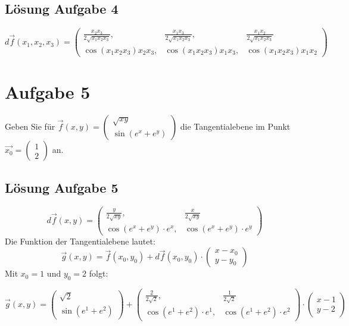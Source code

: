 \documentclass[ngerman, a4paper]{scrartcl}
\begin{document}
	\subsection*{Lösung Aufgabe 4}
	\[
	d\vec{f}(x_1, x_2, x_3) =
	\begin{pmatrix}
		\frac{x_2x_3}{2\sqrt{x_1x_2x_3}}, & \frac{x_1x_3}{2\sqrt{x_1x_2x_3}}, & \frac{x_1x_2}{2\sqrt{x_1x_2x_3}}\\
		\cos(x_1x_2x_3)x_2x_3, & \cos(x_1x_2x_3)x_1x_3, & \cos(x_1x_2x_3)x_1x_2
	\end{pmatrix}
	\]
	
	\section*{Aufgabe 5}
	Geben Sie für 
	$
	\vec{f}(x, y) = 
	\begin{pmatrix}
		\sqrt{xy}\\
		\sin(e^x + e^y)
	\end{pmatrix}
	$
	die Tangentialebene im Punkt 
	$
	\vec{x_0} = 
	\begin{pmatrix}
		1\\
		2
	\end{pmatrix}
	$
	an.
	
	\subsection*{Lösung Aufgabe 5}
	\[
		d\vec{f}(x, y) = 
		\begin{pmatrix}
			\frac{y}{2\sqrt{xy}}, & \frac{x}{2\sqrt{xy}}\\
			\cos(e^x + e^y) \cdot e^x, & \cos(e^x + e^y) \cdot e^y
		\end{pmatrix}
	\]
	Die Funktion der Tangentialebene lautet:
	\[
		\vec{g}(x, y) = \vec{f}(x_0, y_0) + d\vec{f}(x_0, y_0) \cdot
		\begin{pmatrix}
			x-x_0\\
			y-y_0
		\end{pmatrix}
	\]
	Mit $x_0 = 1 \text{ und } y_0 = 2$ folgt:
	
	\[
		\vec{g}(x, y) =
		\begin{pmatrix}
			\sqrt{2}\\
			\sin(e^1 + e^2)
		\end{pmatrix}
		+
		\begin{pmatrix}
			\frac{2}{2\sqrt{2}}, & \frac{1}{2\sqrt{2}}\\
			\cos(e^1 + e^2) \cdot e^1, & \cos(e^1 + e^2) \cdot e^2
		\end{pmatrix}
		\cdot
		\begin{pmatrix}
			x-1\\
			y-2
		\end{pmatrix}
	\]
	
\end{document}
